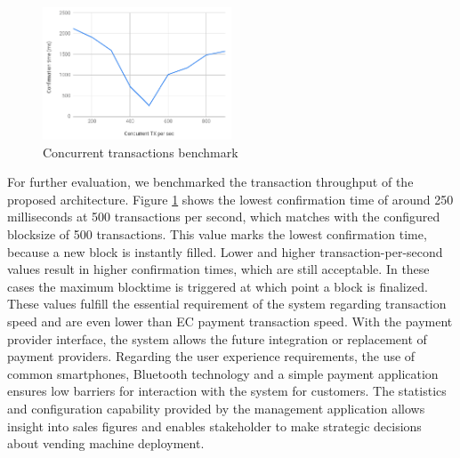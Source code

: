 \begin{figure}[ht]
    \centering
    \includegraphics[width=0.5\textwidth]{assets/benchmark.png}
    \caption{Concurrent transactions benchmark}
    \label{fig:benchmark}
\end{figure}
For further evaluation, we benchmarked the transaction throughput of the proposed architecture. Figure \ref{fig:benchmark} shows the lowest confirmation time of around 250 milliseconds at 500 transactions per second, which matches with the configured blocksize of 500 transactions. This value marks the lowest confirmation time, because a new block is instantly filled. Lower and higher transaction-per-second values result in higher confirmation times, which are still acceptable. In these cases the maximum blocktime is triggered at which point a block is finalized. These values fulfill the essential requirement of the system regarding transaction speed and are even lower than EC payment transaction speed.
With the payment provider interface, the system allows the future integration or replacement of payment providers. 
Regarding the user experience requirements, the use of common smartphones, Bluetooth technology and a simple payment application ensures low barriers for interaction with the system for customers. The statistics and configuration capability provided by the management application allows insight into sales figures and enables stakeholder to make strategic decisions about vending machine deployment.
